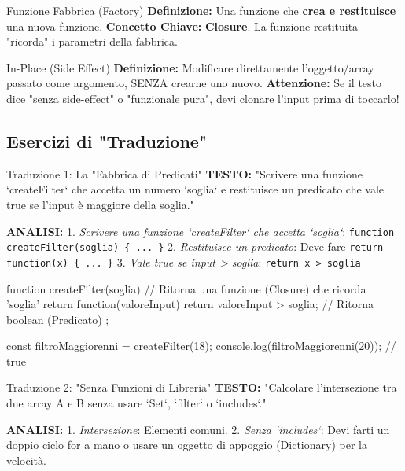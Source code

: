 \begin{dizionario}{Funzione Fabbrica (Factory)}
\textbf{Definizione:} Una funzione che \textbf{crea e restituisce} una nuova funzione.
\textbf{Concetto Chiave:} \textbf{Closure}. La funzione restituita "ricorda" i parametri della fabbrica.
\end{dizionario}

\begin{dizionario}{In-Place (Side Effect)}
\textbf{Definizione:} Modificare direttamente l'oggetto/array passato come argomento, SENZA crearne uno nuovo.
\textbf{Attenzione:} Se il testo dice "senza side-effect" o "funzionale pura", devi clonare l'input prima di toccarlo!
\end{dizionario}

\subsection{Esercizi di "Traduzione"}

\begin{esercizio}{Traduzione 1: La "Fabbrica di Predicati"}
\textbf{TESTO:} "Scrivere una funzione `createFilter` che accetta un numero `soglia` e restituisce un predicato che vale true se l'input è maggiore della soglia."

\textbf{ANALISI:}
1. \textit{Scrivere una funzione `createFilter` che accetta `soglia`}: \texttt{function createFilter(soglia) \{ ... \}}
2. \textit{Restituisce un predicato}: Deve fare \texttt{return function(x) \{ ... \}}
3. \textit{Vale true se input > soglia}: \texttt{return x > soglia}

\end{esercizio}

\begin{jsbox}
function createFilter(soglia) {
    // Ritorna una funzione (Closure) che ricorda 'soglia'
    return function(valoreInput) {
        return valoreInput > soglia; // Ritorna boolean (Predicato)
    };
}

const filtroMaggiorenni = createFilter(18);
console.log(filtroMaggiorenni(20)); // true
\end{jsbox}

\begin{esercizio}{Traduzione 2: "Senza Funzioni di Libreria"}
\textbf{TESTO:} "Calcolare l'intersezione tra due array A e B senza usare `Set`, `filter` o `includes`."

\textbf{ANALISI:}
1. \textit{Intersezione}: Elementi comuni.
2. \textit{Senza `includes`}: Devi farti un doppio ciclo for a mano o usare un oggetto di appoggio (Dictionary) per la velocità.
\end{esercizio}


